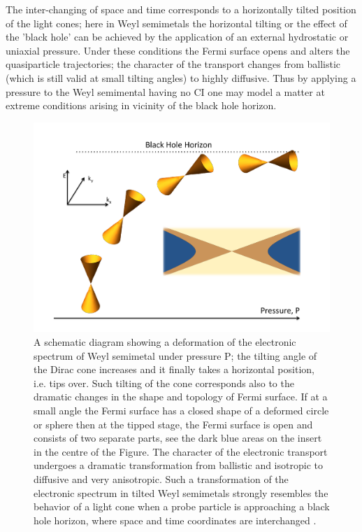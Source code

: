 \documentclass[prb,twocolumn,aps,superscriptaddress,showpacs,floatfix]{revtex4}
\begin{document}
	The inter-changing of space and time corresponds to a horizontally tilted position of the light cones; here in Weyl semimetals the horizontal tilting or the effect of the 'black hole' can be achieved by the application of an external hydrostatic or uniaxial pressure. Under these conditions the Fermi surface opens and alters the quasiparticle trajectories; the character of the transport changes from ballistic (which is still valid at small tilting angles) to highly diffusive. Thus by applying a pressure to the Weyl semimental having no CI one may model a matter at extreme conditions arising in vicinity of the black hole horizon.

\begin{figure}
	\centerline{\includegraphics[scale=0.33]{Pressure-Weyl1}}
	
	\caption{ A schematic diagram showing a deformation of the electronic spectrum of Weyl semimetal under pressure P; the tilting angle of the Dirac cone increases and it finally takes a horizontal position, i.e. tips over. Such tilting of the cone corresponds also to the dramatic changes in the shape and topology of Fermi surface. If at a small angle the Fermi surface has a closed shape of a deformed circle or sphere then at the tipped stage, the Fermi surface is open and consists of two separate parts, see the dark blue areas on the insert in the centre of the Figure. The character of the electronic transport undergoes a dramatic transformation from ballistic and isotropic to diffusive and very anisotropic. Such a transformation of the electronic spectrum in tilted Weyl semimetals strongly resembles the behavior of a light cone when a probe particle is approaching a black hole horizon, where space and time coordinates are interchanged \cite{Novikov-1963}.}
	\label{pressure-weyl}
\end{figure}
\end{document}
